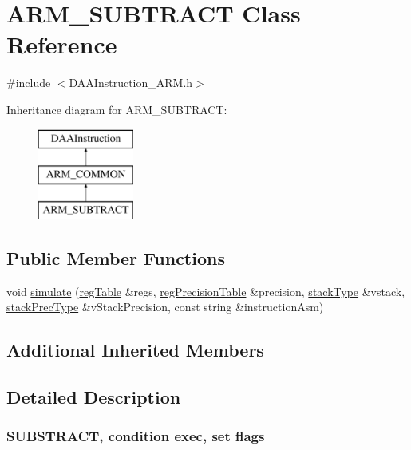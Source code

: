 \hypertarget{classARM__SUBTRACT}{}\section{A\+R\+M\+\_\+\+S\+U\+B\+T\+R\+A\+CT Class Reference}
\label{classARM__SUBTRACT}


{\ttfamily \#include $<$D\+A\+A\+Instruction\+\_\+\+A\+R\+M.\+h$>$}

Inheritance diagram for A\+R\+M\+\_\+\+S\+U\+B\+T\+R\+A\+CT\+:\begin{figure}[H]
\begin{center}
\leavevmode
\includegraphics[height=3.000000cm]{classARM__SUBTRACT}
\end{center}
\end{figure}
\subsection*{Public Member Functions}
\begin{DoxyCompactItemize}
\item 
void \hyperlink{classARM__SUBTRACT_abf5d28fd7366c3310ebe6bbb9b08e26e}{simulate} (\hyperlink{DAAInstruction_8h_af0fae93a861de9cf37988d5673cac523}{reg\+Table} \&regs, \hyperlink{DAAInstruction_8h_a0e8cae02815a5f8adc750122d790b455}{reg\+Precision\+Table} \&precision, \hyperlink{DAAInstruction_8h_a1b0e70ac1a04f06c8132055ed01f589f}{stack\+Type} \&vstack, \hyperlink{DAAInstruction_8h_ac5cb793e9dac3fa9693da78b7e29ab30}{stack\+Prec\+Type} \&v\+Stack\+Precision, const string \&instruction\+Asm)
\end{DoxyCompactItemize}
\subsection*{Additional Inherited Members}


\subsection{Detailed Description}


 \subsubsection*{S\+U\+B\+S\+T\+R\+A\+CT, condition exec, set flags }

